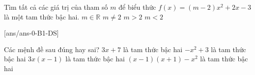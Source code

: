 \begin{ex}%
	Tìm tất cả các giá trị của tham số $m$ để biểu thức $f(x)=\left(m-2\right)x^2+2x-3$ là một tam thức bậc hai.
	\choice
	{$m\in \mathbb{R}$}
	{\True $m\ne 2$}
	{$m > 2$}
	{$m < 2$}
\end{ex}
\cauds
{}[ans/ans-0-B1-DS]
\begin{ex}%
	Các mệnh đề sau đúng hay sai?
	\choiceTF
	{$3x+7$ là tam thức bậc hai}
	{\True $-x^2+3$ là tam thức bậc hai}
	{\True $3x(x-1)$ là tam thức bậc hai}
	{$(x-1)(x+1)-x^2$ là tam thức bậc hai}
\end{ex}
